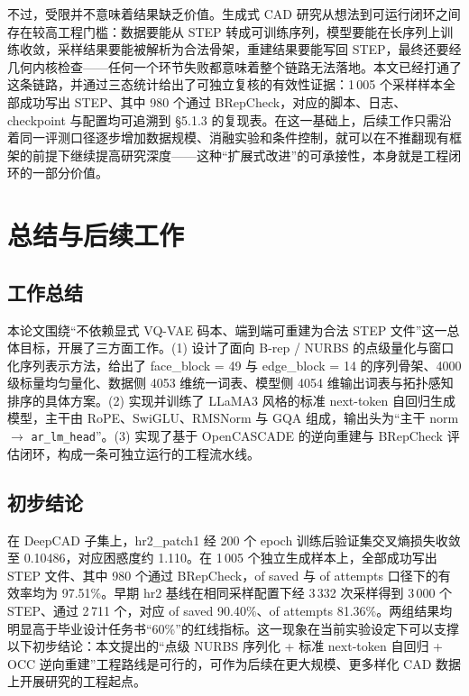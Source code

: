 不过，受限并不意味着结果缺乏价值。生成式 CAD 研究从想法到可运行闭环之间存在较高工程门槛：数据要能从 STEP 转成可训练序列，模型要能在长序列上训练收敛，采样结果要能被解析为合法骨架，重建结果要能写回 STEP，最终还要经几何内核检查——任何一个环节失败都意味着整个链路无法落地。本文已经打通了这条链路，并通过三态统计给出了可独立复核的有效性证据：1\,005 个采样样本全部成功写出 STEP、其中 980 个通过 BRepCheck，对应的脚本、日志、checkpoint 与配置均可追溯到 §5.1.3 的复现表。在这一基础上，后续工作只需沿着同一评测口径逐步增加数据规模、消融实验和条件控制，就可以在不推翻现有框架的前提下继续提高研究深度——这种“扩展式改进”的可承接性，本身就是工程闭环的一部分价值。

\section{总结与后续工作}

\subsection{工作总结}

本论文围绕“不依赖显式 VQ-VAE 码本、端到端可重建为合法 STEP 文件”这一总体目标，开展了三方面工作。(1) 设计了面向 B-rep / NURBS 的点级量化与窗口化序列表示方法，给出了 face\_block = 49 与 edge\_block = 14 的序列骨架、4000 级标量均匀量化、数据侧 4053 维统一词表、模型侧 4054 维输出词表与拓扑感知排序的具体方案。(2) 实现并训练了 LLaMA3 风格的标准 next-token 自回归生成模型，主干由 RoPE、SwiGLU、RMSNorm 与 GQA 组成，输出头为“主干 norm $\to$ \texttt{ar\_lm\_head}”。(3) 实现了基于 OpenCASCADE 的逆向重建与 BRepCheck 评估闭环，构成一条可独立运行的工程流水线。

\subsection{初步结论}

在 DeepCAD 子集上，hr2\_patch1 经 200 个 epoch 训练后验证集交叉熵损失收敛至 0.10486，对应困惑度约 1.110。在 1\,005 个独立生成样本上，全部成功写出 STEP 文件、其中 980 个通过 BRepCheck，of saved 与 of attempts 口径下的有效率均为 97.51\%。早期 hr2 基线在相同采样配置下经 3\,332 次采样得到 3\,000 个 STEP、通过 2\,711 个，对应 of saved 90.40\%、of attempts 81.36\%。两组结果均明显高于毕业设计任务书“60\%”的红线指标。这一现象在当前实验设定下可以支撑以下初步结论：本文提出的“点级 NURBS 序列化 + 标准 next-token 自回归 + OCC 逆向重建”工程路线是可行的，可作为后续在更大规模、更多样化 CAD 数据上开展研究的工程起点。

